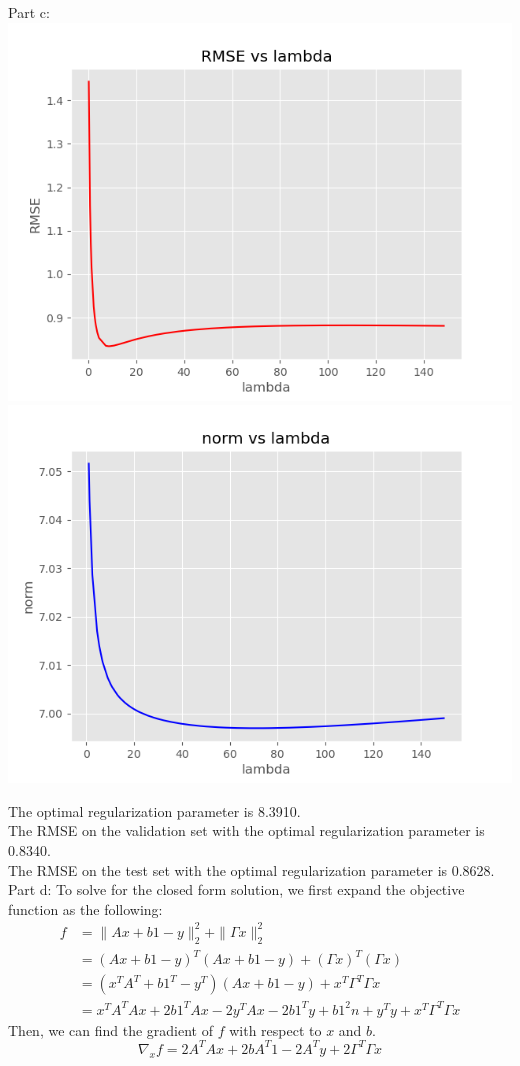 \documentclass[12pt,letterpaper]{hmcpset}
\begin{document}
\begin{solution}
Part c:\\
\includegraphics[scale=0.5]{RMSE_vs_lambda.png}
\includegraphics[scale=0.5]{norm_vs_lambda.png}

The optimal regularization parameter is  8.3910.\\
The RMSE on the validation set with the optimal regularization parameter is  0.8340.\\
The RMSE on the test set with the optimal regularization parameter is  0.8628.
\newpage
Part d:
To solve for the closed form solution, we first expand the objective function as the following:
\begin{align*}
	f &= \| Ax + b1 - y \|_2^2 + \| \Gamma x \|_2^2\\
&= (Ax + b1 - y)^T (Ax + b1 - y) + (\Gamma x)^T (\Gamma x)\\
&= (x^T A^T + b1^T - y^T) (Ax + b1 - y) + x^T \Gamma^T \Gamma x\\
&= x^T A^T Ax + 2b1^T Ax - 2y^T Ax - 2b1^T y + b1^2n + y^T y + x^T \Gamma^T \Gamma x
\end{align*}
Then, we can find the gradient of \( f \) with respect to \( x \) and \( b \).\[
\nabla_x f = 2A^T Ax + 2bA^T 1 - 2A^T y + 2\Gamma^T \Gamma x
\]


\end{solution}
\end{document}
